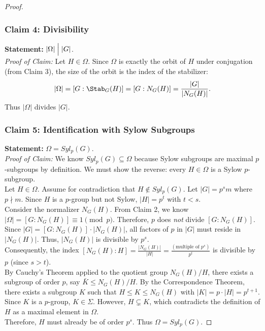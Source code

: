 \documentclass[a4paper,12pt]{article}
\begin{document}
\begin{proof}
    \subsubsection*{Claim 4: Divisibility}
    \textbf{Statement:} $|\Omega| \Bigm| |G|$.\\
    \textit{Proof of Claim:}
    Let $H \in \Omega$. Since $\Omega$ is exactly the orbit of $H$ under conjugation (from Claim 3), the size of the orbit is the index of the stabilizer:
    \[
    |\Omega| = [G : \Stab_G(H)] = [G : N_G(H)] = \frac{|G|}{|N_G(H)|}.
    \]
    Thus $|\Omega|$ divides $|G|$.

    \subsubsection*{Claim 5: Identification with Sylow Subgroups}
    \textbf{Statement:} $\Omega = Syl_p(G)$.\\
    \textit{Proof of Claim:}
    We know $Syl_p(G) \subseteq \Omega$ because Sylow subgroups are maximal $p$-subgroups by definition. We must show the reverse: every $H \in \Omega$ is a Sylow $p$-subgroup.\\ 
    Let $H \in \Omega$. Assume for contradiction that $H \notin Syl_p(G)$.
    Let $|G| = p^s m$ where $p \nmid m$. Since $H$ is a $p$-group but not Sylow, $|H| = p^t$ with $t < s$. \\
    Consider the normalizer $N_G(H)$.
    From Claim 2, we know $|\Omega| = [G : N_G(H)] \equiv 1 \pmod{p}$.
    Therefore, $p$ does \emph{not} divide $[G : N_G(H)]$.
    Since $|G| = [G : N_G(H)] \cdot |N_G(H)|$, all factors of $p$ in $|G|$ must reside in $|N_G(H)|$.
    Thus, $|N_G(H)|$ is divisible by $p^s$.\\
    Consequently, the index $[N_G(H) : H] = \frac{|N_G(H)|}{|H|} = \frac{(\text{multiple of } p^s)}{p^t}$ is divisible by $p$ (since $s > t$).\\
    By Cauchy's Theorem applied to the quotient group $N_G(H)/H$, there exists a subgroup of order $p$, say $\bar{K} \leq N_G(H)/H$.
    By the Correspondence Theorem, there exists a subgroup $K$ such that $H \leq K \leq N_G(H)$ with $|K| = p \cdot |H| = p^{t+1}$.\\
    Since $K$ is a $p$-group, $K \in \Sigma$. However, $H \subsetneq K$, which contradicts the definition of $H$ as a maximal element in $\Omega$.\\
    Therefore, $H$ must already be of order $p^s$. Thus $\Omega = Syl_p(G)$.
\end{proof}
\end{document}
